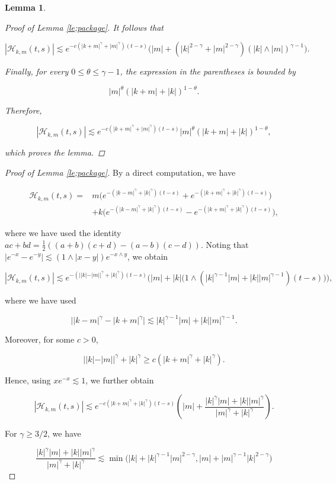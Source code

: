\documentclass[10pt,a4paper]{amsart}
\newtheorem{lemma}{Lemma}
\newcommand{\ml}{\mathcal}
\begin{document}
\begin{lemma}
\begin{proof}[Proof of Lemma \ref{le;package}]
It follows that

$$
|\ml H_{k,m}(t,s)|
\lesssim
e^{-c(|k+m|^\gamma+|m|^\gamma)(t-s)}
\Big(
|m|+
(|k|^{2-\gamma}+|m|^{2-\gamma})
(|k|\wedge|m|)^{\gamma-1}
\Big).
$$

Finally, for every \(0\leq\theta\leq\gamma-1\), the expression in the parentheses is bounded by

$$
|m|^\theta(|k+m|+|k|)^{1-\theta}.
$$

Therefore,

$$
|\ml H_{k,m}(t,s)|
\lesssim
e^{-c(|k+m|^\gamma+|m|^\gamma)(t-s)}
|m|^\theta(|k+m|+|k|)^{1-\theta},
$$

which proves the lemma.
\end{proof}
\end{lemma}

\begin{proof}[Proof of Lemma \ref{le;package}]
By a direct computation, we have

$$
\begin{aligned}
\ml H_{k,m}(t,s)
={}&m\Big(e^{-(|k-m|^\gamma+|k|^\gamma)(t-s)}
+e^{-(|k+m|^\gamma+|k|^\gamma)(t-s)}\Big)\\
&+k\Big(e^{-(|k-m|^\gamma+|k|^\gamma)(t-s)}
-e^{-(|k+m|^\gamma+|k|^\gamma)(t-s)}\Big),
\end{aligned}
$$

where we have used the identity
\(ac+bd=\frac12((a+b)(c+d)-(a-b)(c-d))\). Noting that
\(|e^{-x}-e^{-y}|\lesssim(1\wedge|x-y|)e^{-x\wedge y}\), we obtain

$$
|\ml H_{k,m}(t,s)|
\lesssim
e^{-(||k|-|m||^\gamma+|k|^\gamma)(t-s)}
\Big(
|m|+|k|\big(1\wedge
(|k|^{\gamma-1}|m|+|k||m|^{\gamma-1})(t-s)\big)
\Big),
$$

where we have used

$$
\big||k-m|^\gamma-|k+m|^\gamma\big|
\lesssim |k|^{\gamma-1}|m|+|k||m|^{\gamma-1}.
$$

Moreover, for some \(c>0\),

$$
||k|-|m||^\gamma+|k|^\gamma
\geq c(|k+m|^\gamma+|k|^\gamma).
$$

Hence, using \(xe^{-x}\lesssim1\), we further obtain

$$
|\ml H_{k,m}(t,s)|
\lesssim
e^{-c(|k+m|^\gamma+|k|^\gamma)(t-s)}
\left(
|m|+
\frac{|k|^\gamma|m|+|k||m|^\gamma}
{|m|^\gamma+|k|^\gamma}
\right).
$$

For \(\gamma\geq3/2\), we have

$$
\frac{|k|^\gamma|m|+|k||m|^\gamma}
{|m|^\gamma+|k|^\gamma}
\lesssim
\min\big(
|k|+|k|^{\gamma-1}|m|^{2-\gamma},
|m|+|m|^{\gamma-1}|k|^{2-\gamma}
\big)
$$


\end{proof}
\end{document}
